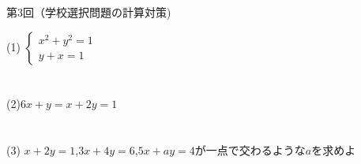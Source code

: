\documentclass{jarticle}
\begin{document}
\begin{center}
第3回（学校選択問題の計算対策)
\end{center}
(1)
$
\begin{cases}
x^{2}+y^{2}=1 \\
y+x=1
\end{cases}
$
\\
\\
\\
(2)$6x+y=x+2y=1$
\\
\\
\\
(3)
$x+2y=1$,$3x+4y=6$,$5x+ay=4$が一点で交わるような$a$を求めよ
\end{document}
